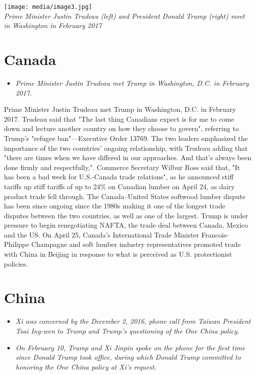 \texttt{[image: media/image3.jpg]}\\
\emph{Prime Minister Justin Trudeau (left) and President Donald Trump
(right) meet in Washington in February 2017}

\section{Canada}\label{canada}

\begin{itemize}
\item
  \emph{Prime Minister Justin Trudeau met Trump in Washington, D.C. in
  February 2017.}
\end{itemize}

Prime Minister Justin Trudeau met Trump in Washington, D.C. in February
2017. Trudeau said that "The last thing Canadians expect is for me to
come down and lecture another country on how they choose to govern",
referring to Trump's "refugee ban"---Executive Order 13769. The two
leaders emphasized the importance of the two countries' ongoing
relationship, with Trudeau adding that "there are times when we have
differed in our approaches. And that's always been done firmly and
respectfully,". Commerce Secretary Wilbur Ross said that, "It has been a
bad week for U.S.-Canada trade relations", as he announced stiff tariffs
up stiff tariffs of up to 24\% on Canadian lumber on April 24, as dairy
product trade fell through. The Canada--United States softwood lumber
dispute has been since ongoing since the 1980s making it one of the
longest trade disputes between the two countries, as well as one of the
largest. Trump is under pressure to begin renegotiating NAFTA, the trade
deal between Canada, Mexico and the US. On April 25, Canada's
International Trade Minister Francois-Philippe Champagne and soft lumber
industry representatives promoted trade with China in Beijing in
response to what is perceived as U.S. protectionist policies.

\section{China}\label{china}

\begin{itemize}
\item
  \emph{Xi was concerned by the December 2, 2016, phone call from Taiwan
  President Tsai Ing-wen to Trump and Trump's questioning of the One
  China policy.}
\item
  \emph{On February 10, Trump and Xi Jinpin spoke on the phone for the
  first time since Donald Trump took office, during which Donald Trump
  committed to honoring the One China policy at Xi's request.}
\end{itemize}

